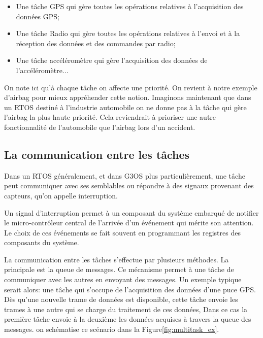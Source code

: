 \documentclass{themeensg}
\begin{document}
\begin{itemize}
\item Une tâche GPS qui gère toutes les opérations relatives à l'acquisition des données GPS;
\item Une tâche Radio qui gère toutes les opérations relatives à l'envoi et  à la réception des données et des commandes par radio;
\item Une tâche accéléromètre qui gère l'acquisition des données de l’accéléromètre...
\end{itemize}

On note ici qu'à chaque tâche on affecte une priorité. On revient à notre exemple d'airbag pour mieux appréhender cette notion. Imaginons maintenant que dans un RTOS destiné à l'industrie automobile on ne donne pas à la tâche qui gère l'airbag la plus haute priorité. Cela reviendrait à prioriser une autre fonctionnalité de l'automobile que l'airbag lors d'un accident.

\subsection{La communication entre les tâches}

Dans un RTOS généralement, et dans G3OS plus particulièrement, une tâche peut communiquer avec ses semblables ou répondre à des signaux provenant des capteurs, qu'on appelle interruption.

Un signal d'interruption permet à un composant du système embarqué de notifier le micro-contrôleur central de l'arrivée d'un événement qui mérite son attention. Le choix de ces événements se fait souvent en programmant les registres des composants du système.

La communication entre les tâches s'effectue par plusieurs méthodes. La principale est la queue de messages. Ce mécanisme permet à une tâche de communiquer avec les autres en envoyant des messages. Un exemple typique serait alors: une tâche qui s'occupe de l'acquisition des données d'une puce GPS. Dès qu'une nouvelle trame de données est disponible, cette tâche envoie les trames à une autre qui se charge  du traitement de ces données, Dans ce cas la première tâche envoie à la deuxième les données acquises à travers la queue des messages. on schématise ce scénario dans la Figure\ref{fig:multitask_ex}.
\end{document}
